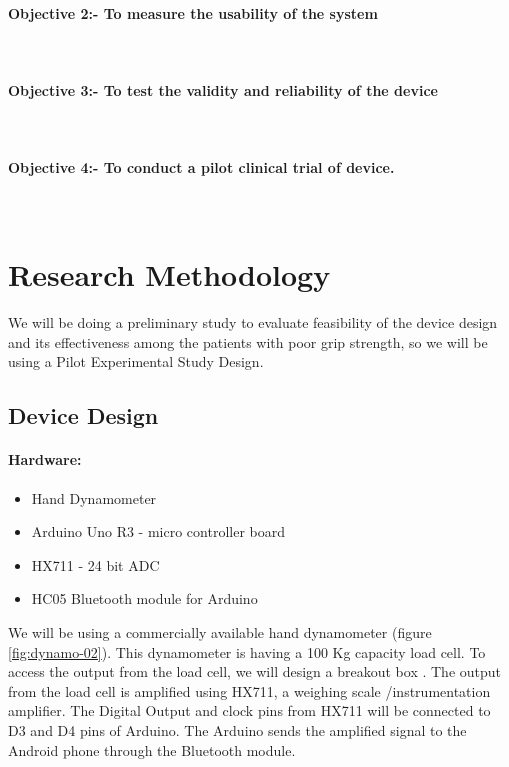 \documentclass[12pt]{article}
\begin{document}
\paragraph{Objective 2:- To measure the usability of the system}~\\

\paragraph{Objective 3:- To test the validity and reliability of the device}~\\

\paragraph{Objective 4:- To conduct a pilot clinical trial of device.}~\\


\section{Research Methodology}
 We will be  doing a preliminary study to evaluate feasibility of the device design and its effectiveness among the patients with poor grip strength, so we will be using a Pilot Experimental Study Design.
\subsection{Device Design}
\paragraph{Hardware:} 
\begin{itemize}
	\item Hand Dynamometer
	\item Arduino Uno R3 - micro controller board
	\item HX711  - 24 bit ADC 
	\item HC05 Bluetooth module for Arduino 
\end{itemize}
We will be using a commercially available hand dynamometer (figure \ref{fig:dynamo-02}). This dynamometer is having a 100 Kg capacity load cell. To access the output from the load cell, we will design a breakout box . The output from the load cell is amplified using HX711, a weighing scale /instrumentation amplifier. The Digital Output and clock pins from HX711 will be connected to D3 and D4 pins of Arduino. The Arduino sends the amplified signal to the Android phone through the Bluetooth module. 
\end{document}
